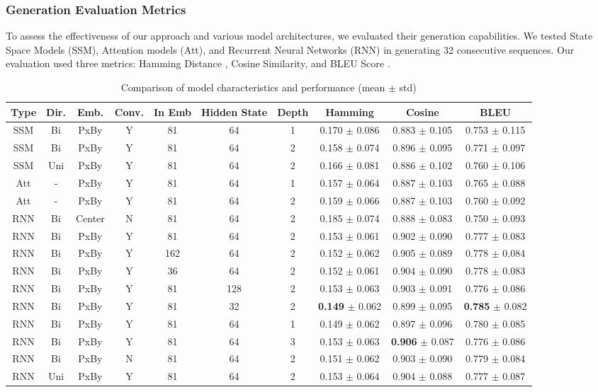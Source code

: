 \documentclass[10pt,a4paper]{article}
\begin{document}
\subsubsection{Generation Evaluation Metrics}

To assess the effectiveness of our approach and various model architectures, we evaluated their generation capabilities. We tested State Space Models (SSM), Attention models (Att), and Recurrent Neural Networks (RNN) in generating 32 consecutive sequences. Our evaluation used three metrics: Hamming Distance \cite{hamming1950error}, Cosine Similarity, and BLEU Score \cite{papineni2002bleu}.

\begin{table}[ht]
\centering
\small
\begin{tabular}{cccccccccc}
\hline
Type & Dir. & Emb. & Conv. & In Emb & Hidden State & Depth & Hamming & Cosine & BLEU \\
\hline
SSM & Bi & PxBy & Y & 81 & 64 & 1 & 0.170 $\pm$ 0.086 & 0.883 $\pm$ 0.105 & 0.753 $\pm$ 0.115 \\
SSM & Bi & PxBy & Y & 81 & 64 & 2 & 0.158 $\pm$ 0.074 & 0.896 $\pm$ 0.095 & 0.771 $\pm$ 0.097 \\
SSM & Uni & PxBy & Y & 81 & 64 & 2 & 0.166 $\pm$ 0.081 & 0.886 $\pm$ 0.102 & 0.760 $\pm$ 0.106 \\
Att & - & PxBy & Y & 81 & 64 & 1 & 0.157 $\pm$ 0.064 & 0.887 $\pm$ 0.103 & 0.765 $\pm$ 0.088 \\
Att & - & PxBy & Y & 81 & 64 & 2 & 0.159 $\pm$ 0.066 & 0.887 $\pm$ 0.103 & 0.760 $\pm$ 0.092 \\
RNN & Bi & Center & N & 81 & 64 & 2 & 0.185 $\pm$ 0.074 & 0.888 $\pm$ 0.083 & 0.750 $\pm$ 0.093 \\
RNN & Bi & PxBy & Y & 81 & 64 & 2 & 0.153 $\pm$ 0.061 & 0.902 $\pm$ 0.090 & 0.777 $\pm$ 0.083 \\
RNN & Bi & PxBy & Y & 162 & 64 & 2 & 0.152 $\pm$ 0.062 & 0.905 $\pm$ 0.089 & 0.778 $\pm$ 0.084 \\
RNN & Bi & PxBy & Y & 36 & 64 & 2 & 0.152 $\pm$ 0.061 & 0.904 $\pm$ 0.090 & 0.778 $\pm$ 0.083 \\
RNN & Bi & PxBy & Y & 81 & 128 & 2 & 0.153 $\pm$ 0.063 & 0.903 $\pm$ 0.091 & 0.776 $\pm$ 0.086 \\
RNN & Bi & PxBy & Y & 81 & 32 & 2 & \textbf{0.149} $\pm$ 0.062 & 0.899 $\pm$ 0.095 & \textbf{0.785} $\pm$ 0.082 \\
RNN & Bi & PxBy & Y & 81 & 64 & 1 & 0.149 $\pm$ 0.062 & 0.897 $\pm$ 0.096 & 0.780 $\pm$ 0.085 \\
RNN & Bi & PxBy & Y & 81 & 64 & 3 & 0.153 $\pm$ 0.063 & \textbf{0.906} $\pm$ 0.087 & 0.776 $\pm$ 0.086 \\
RNN & Bi & PxBy & N & 81 & 64 & 2 & 0.151 $\pm$ 0.062 & 0.903 $\pm$ 0.090 & 0.779 $\pm$ 0.084 \\
RNN & Uni & PxBy & Y & 81 & 64 & 2 & 0.153 $\pm$ 0.064 & 0.904 $\pm$ 0.088 & 0.777 $\pm$ 0.087 \\
\hline
\end{tabular}
\caption{Comparison of model characteristics and performance (mean $\pm$ std)}
\label{tab:model_comparison}
\end{table}
\end{document}
